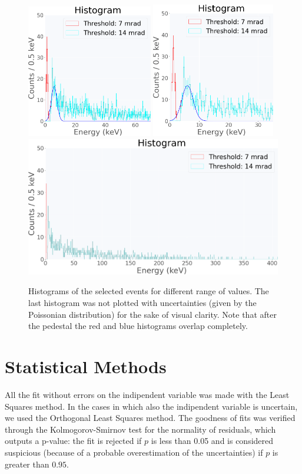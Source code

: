 \documentclass[12pt]{article}
\begin{document}
\begin{figure}[H]
\centering
\includegraphics[width=0.49\textwidth]{Figure_1.png}
\includegraphics[width=0.48\textwidth]{Figure_2.png}
\includegraphics[width=\textwidth]{Figure_3.png}
\caption{Histograms of the selected events for different range of values. The last histogram was not plotted with uncertainties (given by the Poissonian distribution) for the sake of visual clarity. Note that after the pedestal the red and blue histograms overlap completely.}
\end{figure}
\section{Statistical Methods}
All the fit without errors on the indipendent variable was made with the Least Squares method. In the cases in which also the indipendent variable is uncertain, we used the Orthogonal Least Squares method. The goodness of fits was verified through the Kolmogorov-Smirnov test for the normality of residuals, which outputs a p-value: the fit is rejected if $p$ is less than 0.05 and is considered suspicious (because of a probable overestimation of the uncertainties) if $p$ is greater than $0.95$. 
\end{document}
